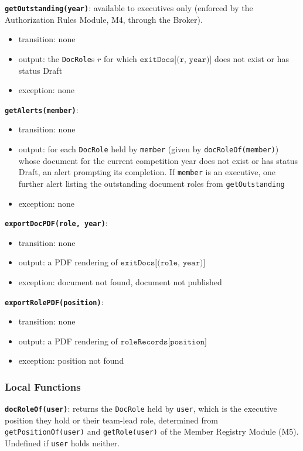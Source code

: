 \documentclass[12pt, titlepage]{article}
\begin{document}
\textbf{\texttt{getOutstanding(year)}}: available to executives only (enforced by the Authorization Rules Module, M4, through the Broker).
\begin{itemize}
  \item transition: none
  \item output: the \texttt{DocRole}s $r$ for which $\texttt{exitDocs[(r, year)]}$ does not exist or has status Draft
  \item exception: none
\end{itemize}

\textbf{\texttt{getAlerts(member)}}:
\begin{itemize}
  \item transition: none
  \item output: for each \texttt{DocRole} held by \texttt{member} (given by \texttt{docRoleOf(member)}) whose document for the current competition year does not exist or has status Draft, an alert prompting its completion. If \texttt{member} is an executive, one further alert listing the outstanding document roles from \texttt{getOutstanding}
  \item exception: none
\end{itemize}

\textbf{\texttt{exportDocPDF(role, year)}}:
\begin{itemize}
  \item transition: none
  \item output: a PDF rendering of $\texttt{exitDocs[(role, year)]}$
  \item exception: document not found, document not published
\end{itemize}

\textbf{\texttt{exportRolePDF(position)}}:
\begin{itemize}
  \item transition: none
  \item output: a PDF rendering of $\texttt{roleRecords[position]}$
  \item exception: position not found
\end{itemize}

\subsubsection{Local Functions}
\textbf{\texttt{docRoleOf(user)}}: returns the \texttt{DocRole} held by \texttt{user}, which is the executive position they hold or their team-lead role, determined from \texttt{getPositionOf(user)} and \texttt{getRole(user)} of the Member Registry Module (M5). Undefined if \texttt{user} holds neither.
\end{document}
